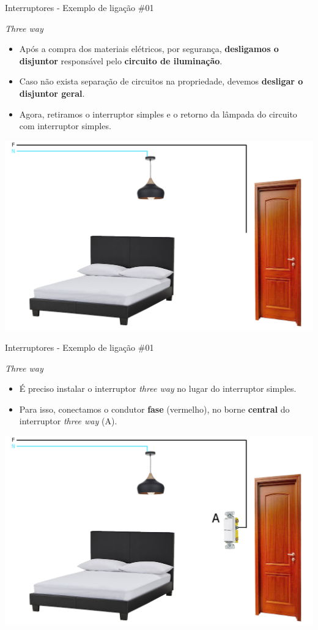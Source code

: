 \begin{frame}{Interruptores - Exemplo de ligação \#01}
	\begin{block}{\textit{Three way}}
		\begin{itemize}
			\item Após a compra dos materiais elétricos, por segurança, \textbf{desligamos o disjuntor} responsável pelo \textbf{circuito de iluminação}.
			\item Caso não exista separação de circuitos na propriedade, devemos \textbf{desligar o disjuntor geral}.
			\item Agora, retiramos o interruptor simples e o retorno da lâmpada do circuito com interruptor simples.
		\end{itemize}
	\end{block}

	\centering
	\includegraphics[width=0.5\linewidth]{Figuras/Ch08/fig18.1}
\end{frame}


\begin{frame}{Interruptores - Exemplo de ligação \#01}
	\begin{block}{\textit{Three way}}
		\begin{itemize}
			\item É preciso instalar o interruptor \textit{three way} no lugar do interruptor simples.
			\item Para isso, conectamos o condutor \textbf{fase} (vermelho), no borne \textbf{central} do interruptor \textit{three way} (A).
		\end{itemize}
	\end{block}

	\bigskip

	\centering
	\includegraphics[width=0.6\linewidth]{Figuras/Ch08/fig19.1}
\end{frame}


